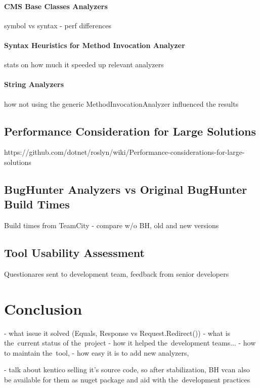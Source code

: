 \documentclass[
  digital, %
  table,   %
  lof,     %
  lot,     %
  oneside,
]{fithesis3}
\begin{document}
\subsubsection{CMS Base Classes Analyzers}
symbol vs syntax - perf differences

\subsubsection{Syntax Heuristics for Method Invocation Analyzer}
stats on how much it speeded up relevant analyzers

\subsubsection{String Analyzers}
how not using the generic MethodInvocationAnalyzer influenced the results

\section{Performance Consideration for Large Solutions}
https://github.com/dotnet/roslyn/wiki/Performance-considerations-for-large-solutions

\section{BugHunter Analyzers vs Original BugHunter Build Times}
Build times from TeamCity - compare w/o BH, old and new versions

\section{Tool Usability Assessment}
Questionares sent to development team, feedback from senior developers

\chapter{Conclusion}
  - what issue it solved (Equals, Response vs Request.Redirect())
  - what is the~current status of the~project
  - how it helped the~development teams...
  - how to maintain the~tool, 
  - how easy it is to add new analyzers, 

- talk about kentico selling it's source code, so after stabilization, BH vcan also be available for them as nuget package and aid with the~development practices 
\end{document}
